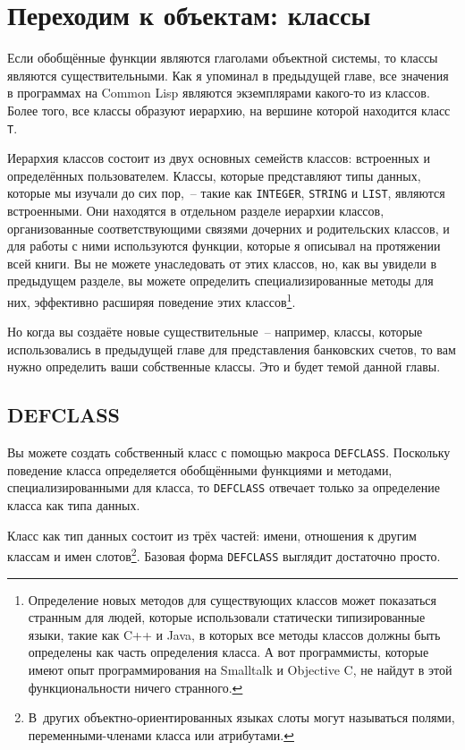 \chapter{Переходим к объектам: классы}
\label{ch:17}

\thispagestyle{empty}

Если обобщённые функции являются глаголами объектной системы, то классы являются
существительными.  Как я упоминал в предыдущей главе, все значения в программах на Common
Lisp являются экземплярами какого-то из классов.  Более того, все классы образуют иерархию,
на вершине которой находится класс \lstinline{T}.

Иерархия классов состоит из двух основных семейств классов: встроенных и определённых
пользователем.  Классы, которые представляют типы данных, которые мы изучали до сих
пор,~-- такие как \lstinline{INTEGER}, \lstinline{STRING} и \lstinline{LIST}, являются встроенными.  Они
находятся в отдельном разделе иерархии классов, организованные соответствующими связями
дочерних и родительских классов, и для работы с ними используются функции, которые я
описывал на протяжении всей книги.  Вы не можете унаследовать от этих классов, но, как вы
увидели в предыдущем разделе, вы можете определить спе\-циа\-ли\-зи\-ро\-ван\-ные методы для них,
эффективно расширяя поведение этих классов\footnote{Определение новых методов для
    существующих классов может показаться странным для людей, которые использовали
    статически типизированные языки, такие как C++ и Java, в которых все методы классов
    должны быть определены как часть определения класса.  А вот программисты, которые
    имеют опыт программирования на Smalltalk и Objective C, не найдут в этой
функциональности ничего странного.}.

Но когда вы создаёте новые существительные~-- например, классы, которые использовались в
предыдущей главе для представления банковских счетов, то вам нужно определить ваши
собственные классы.  Это и будет темой данной главы.

\section{DEFCLASS}

Вы можете создать собственный класс с помощью макроса \lstinline{DEFCLASS}.  Поскольку
поведение класса определяется обобщёнными функциями и методами, специализированными для
класса, то \lstinline{DEFCLASS} отвечает только за определение класса как типа данных.

Класс как тип данных состоит из трёх частей: имени, отношения к другим классам и имен
слотов\footnote{В~других объектно-ориентированных языках слоты могут называться полями,
переменными-членами класса или атрибутами.}.  Базовая форма \lstinline{DEFCLASS} выглядит
достаточно просто.


